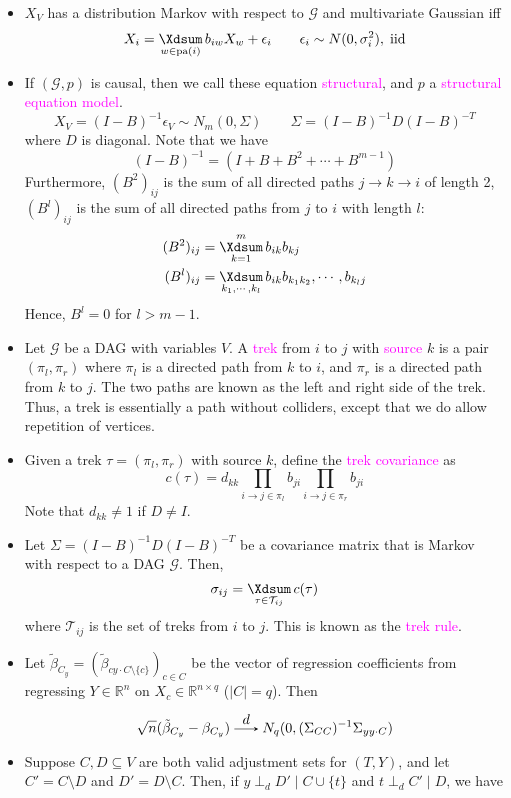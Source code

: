 \documentclass[UTF8]{book}
\DeclareMathOperator*{\Xsum}{\mathchoice{\Xdsum}{\Xtsum}{\Xtsum}{\Xtsum}}
\newcommand{\et}{&}
\newcommand{\f}{^2}
\newcommand{\concept}[1]{\textcolor{magenta}{#1}}
\newcommand{\cid}{\tikz[baseline=-0.55ex]\draw[-stealth] (0,0) -- (2mm,0) node[above]{$\;\;d$}--+ (4mm,0);\;} %
\begin{document}
\begin{itemize}
\item $X_V$ has a distribution Markov with respect to $\mathcal{G}$ and multivariate Gaussian iff
$$
X_i = \Xsum_{w\in\mathrm{pa}(i)}b_{iw}X_w + \epsilon_i \qquad \epsilon_i\sim N(0, \sigma_i\f), \; \mathrm{iid}
$$
\item If $(\mathcal{G}, p)$ is causal, then we call these equation \concept{structural}, and $p$ a \concept{structural equation model}.
$$
X_V = (I-B)^{-1}\epsilon_V \sim N_m(0, \Sigma) \qquad \Sigma = (I-B)^{-1}D(I-B)^{-T}
$$
where $D$ is diagonal. Note that we have
$$
(I-B)^{-1} = (I + B + B\f + \cdots + B^{m-1})
$$
Furthermore, $(B\f)_{ij}$ is the sum of all directed paths $j\rightarrow k\rightarrow i$ of length 2, $(B^l)_{ij}$ is the sum of all directed paths from $j$ to $i$ with length $l$:
\begin{align*}
	(B\f)_{ij} \et = \Xsum_{k=1}^m b_{ik}b_{kj} \\
	(B^l)_{ij} \et = \Xsum_{k_1,\cdots , k_l}b_{ik}b_{k_1k_2},\cdots,b_{k_lj}
\end{align*}
Hence, $B^l = 0$ for $l>m-1$.
\item Let $\mathcal{G}$ be a DAG with variables $V$. A \concept{trek} from $i$ to $j$ with \concept{source} $k$ is a pair $(\pi_l, \pi_r)$ where $\pi_l$ is a directed path from $k$ to $i$, and $\pi_r$ is a directed path from $k$ to $j$. The two paths are known as the left and right side of the trek. Thus, a trek is essentially a path without colliders, except that we do allow repetition of vertices.
\item Given a trek $\tau = (\pi_l, \pi_r)$ with source $k$, define the \concept{trek covariance} as
$$
c(\tau) = d_{kk}\prod_{i\rightarrow j\in\pi_l}b_{ji}\prod_{i\rightarrow j\in\pi_r} b_{ji}
$$
Note that $d_{kk}\neq 1$ if $D\neq I$.
\item Let $\Sigma = (I-B)^{-1}D(I-B)^{-T}$ be a covariance matrix that is Markov with respect to a DAG $\mathcal{G}$. Then,
$$
\sigma_{ij} = \Xsum_{\tau\in\mathcal{T}_{ij}}c(\tau)
$$
where $\mathcal{T}_{ij}$ is the set of treks from $i$ to $j$. This is known as the \concept{trek rule}.
\item Let $\tilde{\beta}_{C_y} = (\tilde{\beta}_{cy\cdot C\setminus\{c\}})_{c\in C}$ be the vector of regression coefficients from regressing $Y\in\mathbb{R}^n$ on $X_c\in\mathbb{R}^{n\times q}$ ($|C| = q$). Then
$$
\sqrt{n}(\tilde{\beta}_{C_y}-\beta_{C_y}) \cid N_q(0, (\Sigma_{CC})^{-1}\Sigma_{yy\cdot C})
$$ 
\item Suppose $C,D\subseteq V$ are both valid adjustment sets for $(T,Y)$, and let $C' = C\setminus D$ and $D' = D\setminus C$. Then, if $y\perp_d D'\mid C\cup\{t\}$ and $t\perp_d C'\mid D$, we have

\end{itemize}
\end{document}
